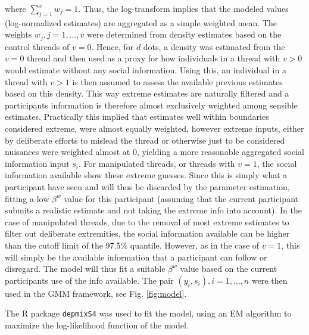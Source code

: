 \documentclass[9pt,a4paper,twocolumn,lineno]{article}
\begin{document}
where $\sum_{j=1}^v w_j = 1$. Thus, the log-transform implies that the modeled values (log-normalized estimates) are aggregated as a simple weighted mean. The weights $w_j, j=1,\dots,v$ were determined from density estimates based on the control threads of $v=0$. Hence, for $d$ dots, a density was estimated from the $v=0$ thread and then used as a proxy for how individuals in a thread with $v>0$ would estimate without any social information. Using this, an individual in a thread with $v>1$ is then assumed to assess the available previous estimates based on this density. This way extreme estimates are naturally filtered and a participants information is therefore almost exclusively weighted among sensible estimates. Practically this implied that estimates well within boundaries considered extreme, were almost equally weighted, however extreme inputs, either by deliberate efforts to mislead the thread or otherwise just to be considered nuisances were weighted almost at 0, yielding a more reasonable aggregated social information input $s_i$. For manipulated threads, or threads with $v=1$, the social information available show these extreme guesses. Since this is simply what a participant have seen and will thus be discarded by the parameter estimation, fitting a low $\beta^w$ value for this participant (assuming that the current participant submits a realistic estimate and not taking the extreme info into account). In the case of manipulated threads, due to the removal of most extreme estimates to filter out deliberate extremities, the social information available can be higher than the cutoff limit of the 97.5\% quantile. However, as in the case of $v=1$, this will simply be the available information that a participant can follow or disregard. The model will thus fit a suitable $\beta^w$ value based on the current participants use of the info available. The pair $(y_i,s_i), i=1,\dots,n$ were then used in the GMM framework, see Fig. \ref{fig:model}.

The R package \texttt{depmixS4} \cite{visser2010} was used to fit the model, using an EM algorithm to maximize the log-likelihood function of the model. 
\end{document}
